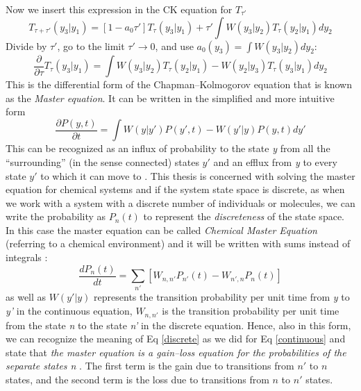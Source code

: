 \documentclass[12pt,a4paper]{report}
\begin{document}
Now we insert this expression in the CK equation for $T_{\tau'}$
\begin{equation}
    T_{\tau+\tau'}(y_{3}|y_{1}) = [1 - a_{0}\tau']T_{\tau}(y_{3}|y_{1})+ \tau'\int W(y_{3}|y_{2})T_{\tau}(y_{2}|y_{1})dy_{2}
\end{equation}
Divide by $\tau'$, go to the limit $\tau' \rightarrow 0$, and use $a_{0}(y_{3})=\int W(y_{3}|y_{2}) dy_{2}$:
\begin{equation}
    \frac{\partial }{\partial \tau}T_{\tau}(y_{3}|y_{1}) = \int {W(y_{3}|y_{2})T_{\tau}(y_{2}|y_{1}) - W(y_{2}|y_{3})T_{\tau}(y_{3}|y_{1})}dy_{2}
\end{equation}
This is the differential form of the Chapman–Kolmogorov equation that is known as the \emph{Master equation}. It can be written in the simplified and more intuitive form
\begin{equation}\label{continuous}
    \frac{\partial P(y,t)}{\partial t} = \int {W(y|y')P(y',t)-W(y'|y)P(y,t)}dy'
\end{equation}
This can be recognized as an influx of probability to the state \emph{y} from all the ``surrounding'' (in the sense connected) states $y'$ and an efflux from \emph{y} to every state $y'$ to which it can move to \cite{PHD}. This thesis is concerned with solving the master equation for chemical systems and if the system state space is discrete, as when we work with a system with a discrete number of individuals or molecules, we can write the probability as $P_{n}(t)$ to represent the \emph{discreteness} of the state space. In this case the master equation can be called \emph{Chemical Master Equation} (referring to a chemical environment) and it will be written with sums instead of integrals \cite{PHD}:
\begin{equation}\label{discrete}
        \frac{dP_{n}(t)}{dt} = \sum_{n'}[W_{n,n'}P_{n'}(t)-W_{n',n}P_{n}(t)]
\end{equation}
as well as $W(y'|y)$ represents the transition probability per unit time from \emph{y} to \emph{y'} in the continuous equation, $W_{n,n'}$ is the transition probability per unit time from the state \emph{n} to the state \emph{n'} in the discrete equation. Hence, also in this form, we can recognize the meaning of Eq \ref{discrete} as we did for Eq \ref{continuous} and state that \emph{the master equation is a gain–loss equation for the probabilities of the separate states n} \cite{Math}.  The first term is the gain due to transitions from $n'$ to $n$ states, and the second term is the loss due to transitions from $n$ to $n'$ states.
\end{document}
